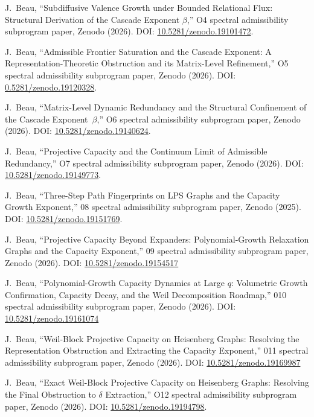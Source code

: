 J.~Beau,
``Subdiffusive Valence Growth under Bounded Relational Flux: Structural Derivation of the Cascade Exponent $\beta$,''
O4 spectral admissibility subprogram paper, Zenodo (2026).
DOI: \href{https://doi.org/10.5281/zenodo.19101472}{10.5281/zenodo.19101472}.

J.~Beau,
``Admissible Frontier Saturation and the Cascade Exponent: A Representation-Theoretic Obstruction and its Matrix-Level
Refinement,''
O5 spectral admissibility subprogram paper, Zenodo (2026).
DOI: \href{https://doi.org/10.5281/zenodo.19120328}{0.5281/zenodo.19120328}.

J.~Beau,
``Matrix-Level Dynamic Redundancy and the Structural Confinement of the Cascade Exponent~$\beta$,''
O6 spectral admissibility subprogram paper, Zenodo (2026).
DOI: \href{https://doi.org/10.5281/zenodo.19140624}{10.5281/zenodo.19140624}.

J.~Beau,
``Projective Capacity and the Continuum Limit of Admissible Redundancy,''
O7 spectral admissibility subprogram paper, Zenodo (2026).
DOI: \href{https://doi.org/10.5281/zenodo.19149773}{10.5281/zenodo.19149773}.

J.~Beau,
``Three-Step Path Fingerprints on LPS Graphs and the Capacity Growth Exponent,''
08 spectral admissibility subprogram paper, Zenodo (2025).
DOI: \href{https://doi.org/10.5281/zenodo.19151769}{10.5281/zenodo.19151769}.

J.~Beau,
``Projective Capacity Beyond Expanders: Polynomial-Growth Relaxation Graphs and the Capacity Exponent,''
09 spectral admissibility subprogram paper, Zenodo (2026).
DOI: \href{https://doi.org/10.5281/zenodo.19154517}{10.5281/zenodo.19154517}

J.~Beau,
``Polynomial-Growth Capacity Dynamics at Large $q$: Volumetric Growth Confirmation, Capacity Decay, and the Weil
Decomposition Roadmap,''
010 spectral admissibility subprogram paper, Zenodo (2026).
DOI: \href{https://doi.org/10.5281/zenodo.19161074}{10.5281/zenodo.19161074}

J.~Beau,
``Weil-Block Projective Capacity on Heisenberg Graphs: Resolving the Representation Obstruction and Extracting the
Capacity Exponent,''
011 spectral admissibility subprogram paper, Zenodo (2026).
DOI: \href{https://doi.org/10.5281/zenodo.19169987}{10.5281/zenodo.19169987}

J.~Beau,
``Exact Weil-Block Projective Capacity on Heisenberg Graphs: Resolving the Final Obstruction to $\delta$ Extraction,''
O12 spectral admissibility subprogram paper, Zenodo (2026).
DOI: \href{https://doi.org/10.5281/zenodo.19194798}{10.5281/zenodo.19194798}.

